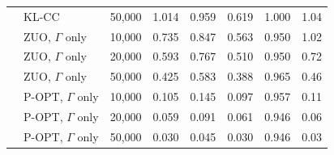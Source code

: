 \begin{tabular}{llrrrrrr}
 & KL-CC & 50,000 & 1.014 & 0.959 & 0.619 & 1.000 & 1.04\\
 & ZUO, \(\Gamma\) only & 10,000 & 0.735 & 0.847 & 0.563 & 0.950 & 1.02\\
 & ZUO, \(\Gamma\) only & 20,000 & 0.593 & 0.767 & 0.510 & 0.950 & 0.72\\
 & ZUO, \(\Gamma\) only & 50,000 & 0.425 & 0.583 & 0.388 & 0.965 & 0.46\\
 & P-OPT, \(\Gamma\) only & 10,000 & 0.105 & 0.145 & 0.097 & 0.957 & 0.11\\
 & P-OPT, \(\Gamma\) only & 20,000 & 0.059 & 0.091 & 0.061 & 0.946 & 0.06\\
 & P-OPT, \(\Gamma\) only & 50,000 & 0.030 & 0.045 & 0.030 & 0.946 & 0.03\\
\bottomrule
\end{tabular}
